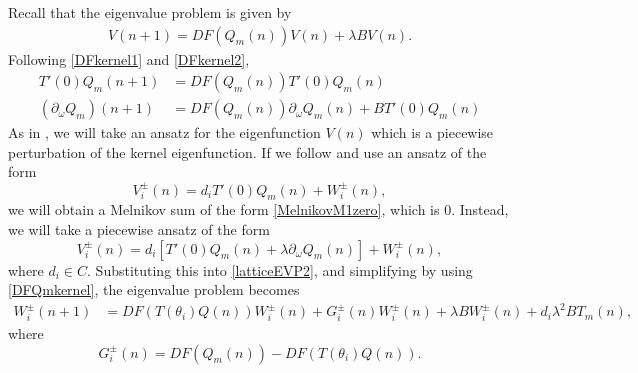 \documentclass[12pt]{article}
\begin{document}
Recall that the eigenvalue problem is given by 
\begin{align}\label{latticeEVP2}
V(n+1) = DF(Q_m(n)) V(n) + \lambda B V(n).
\end{align}
Following \eqref{DFkernel1} and \eqref{DFkernel2}, 
\begin{equation}\label{DFQmkernel}
\begin{aligned}
T'(0)Q_m(n+1) &= DF(Q_m(n))T'(0)Q_m(n) \\
(\partial_\omega Q_m)(n+1) &= DF(Q_m(n))\partial_\omega Q_m(n) + B T'(0)Q_m(n)
\end{aligned}
\end{equation}
As in \cite{Sandstede1998}, we will take an ansatz for the eigenfunction $V(n)$ which is a piecewise perturbation of the kernel eigenfunction. If we follow \cite{Sandstede1998} and 
use an ansatz of the form 
\begin{equation*}
V_i^\pm(n) = 
d_i T'(0)Q_m(n) + W_i^\pm(n),
\end{equation*}
we will obtain a Melnikov sum of the form \eqref{MelnikovM1zero}, which is 0. Instead, we will take a piecewise ansatz of the form
\begin{equation}\label{Viansatz2}
V_i^\pm(n) = 
d_i [ T'(0)Q_m(n) + \lambda \partial_\omega Q_m(n) ] + W_i^\pm(n),
\end{equation}
where $d_i \in C$. Substituting this into \eqref{latticeEVP2}, and simplifying by using \eqref{DFQmkernel}, the eigenvalue problem becomes
\begin{align}\label{Weq1}
W_i^\pm(n+1)
&= DF(T(\theta_i) Q(n) ) W_i^\pm(n) + G_i^\pm(n)W_i^\pm(n) + \lambda B W_i^\pm(n) + d_i \lambda^2 B T_m(n),
\end{align}
where
\begin{equation}
G_i^\pm(n) = DF(Q_m(n)) - DF(T(\theta_i) Q(n) ).
\end{equation}
\end{document}
